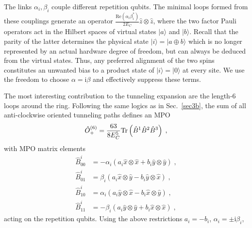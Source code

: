 \documentclass[twocolumn,floats,prx,showpacs]{revtex4-1}
\newcommand{\ket}[1]{|#1\rangle}
\begin{document}
The links $\alpha_i, \beta_i$ couple different repetition qubits. The minimal loops formed from these couplings generate an operator $\frac{\text{Re}\left(\alpha_i  \beta_i^\ast\right)}{2 E_C} \hat z \otimes  \hat z$, where the two factor Pauli operators act in the Hilbert spaces of virtual states $\ket{a}$ and $\ket{b}$. Recall that the parity of the latter determines the physical state $\ket{i}=\ket{a \oplus b}$ which is no longer represented by an actual hardware degree of freedom, but can always be deduced from the virtual states. Thus, any preferred alignment of the two spins constitutes an unwanted bias to a product state of $\ket{i}=\ket{0}$ at every site. 
We use the freedom to choose  $\alpha = \mathrm i \beta$ and effectively suppress these terms. 

The most interesting contribution to the tunneling expansion are the  length-6 loops around the ring.  Following the same logics as in Sec.~\ref{sec3b}, the sum of all anti-clockwise oriented tunneling paths defines an MPO 
\begin{equation}
\hat O_+^{(6)}=\frac{63}{8E_C^5} {\rm Tr} \left( \hat B^1  \hat B^2 \hat B^3\right)\;,
\end{equation}
with MPO matrix elements 
\begin{align}
\hat B^i_{00}&=  - \alpha_i ( a_i \hat x \otimes \hat x + b_i  \hat y \otimes \hat y)  \;, \label{eq:B} \\
\hat B^i_{01}&= \beta_i (a_i \hat x \otimes \hat y - b_i \hat y \otimes \hat x)  \;, \nonumber \\
\hat B^i_{10}&=\alpha_i(a_i \hat y \otimes \hat x - b_i \hat x \otimes \hat y)  \;, \nonumber \\
\hat B^i_{11}&=-\beta_i(a_i \hat y \otimes \hat y + b_i \hat x \otimes \hat x) \;,  \nonumber 
\end{align}
acting on the repetition qubits.
Using the above restrictions  $a_i=-b_i$, $\alpha_i = \pm \mathrm i \beta_i$,  
\end{document}
